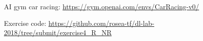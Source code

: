 \documentclass[a4paper, 11pt, conference]{ieeeconf}      %
\begin{document}


\begin{thebibliography}{99}

 AI gym car racing: \url{https://gym.openai.com/envs/CarRacing-v0/}

 Exercise code: \url{https://github.com/rosea-tf/dl-lab-2018/tree/submit/exercise4_R_NR}



\end{thebibliography}









\end{document}
